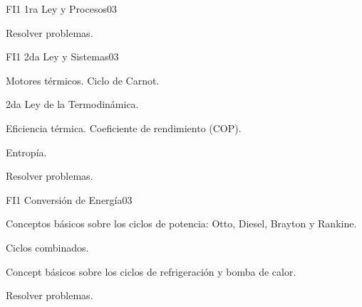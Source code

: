\begin{syllabus}
\begin{unit}{FI1 1ra Ley y Procesos}{}{0}{3}
   \begin{learningoutcomes}
      \item Resolver problemas.
   \end{learningoutcomes}
\end{unit}

\begin{unit}{FI1 2da Ley y Sistemas}{}{0}{3}
\begin{topics}
      \item Motores térmicos. Ciclo de Carnot.
      \item 2da Ley de la Termodinámica.
      \item Eficiencia térmica. Coeficiente de rendimiento (COP).
      \item Entropía.
      
%       
   \end{topics}

   \begin{learningoutcomes}
      \item Resolver problemas.
   \end{learningoutcomes}
\end{unit}

\begin{unit}{FI1 Conversión de Energí­a}{}{0}{3}
\begin{topics}
      \item Conceptos básicos sobre los ciclos de potencia: Otto, Diesel, Brayton y Rankine.
      \item Ciclos combinados.
      \item Concept básicos sobre los ciclos de refrigeración y bomba de calor.
     
     
   \end{topics}

   \begin{learningoutcomes}
      \item Resolver problemas.
   \end{learningoutcomes}
\end{unit}



\begin{coursebibliography}
\end{coursebibliography}

\end{syllabus}
